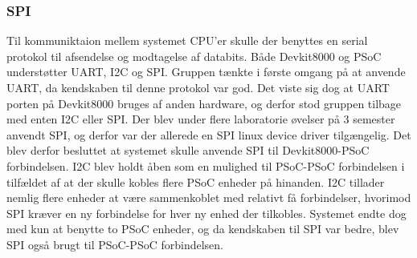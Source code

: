 \subsubsection{SPI}

Til kommuniktaion mellem systemet CPU'er skulle der benyttes en serial protokol til afsendelse og modtagelse af databits.
Både Devkit8000 og PSoC understøtter UART, I2C og SPI. Gruppen tænkte i første omgang på at anvende UART, da kendskaben til denne protokol var god.
Det viste sig dog at UART porten på Devkit8000 bruges af anden hardware, og derfor stod gruppen tilbage med enten I2C eller SPI. Der blev under flere 
laboratorie øvelser på 3 semester anvendt SPI, og derfor var der allerede en SPI linux device driver tilgængelig. Det blev derfor besluttet at systemet 
skulle anvende SPI til Devkit8000-PSoC forbindelsen. I2C blev holdt åben som en mulighed til PSoC-PSoC forbindelsen i tilfældet af at der skulle kobles 
flere PSoC enheder på hinanden. I2C tillader nemlig flere enheder at være sammenkoblet med relativt få forbindelser, hvorimod SPI kræver en ny forbindelse for 
hver ny enhed der tilkobles. Systemet endte dog med kun at benytte to PSoC enheder, og da kendskaben til SPI var bedre, blev SPI også brugt til PSoC-PSoC
forbindelsen.     